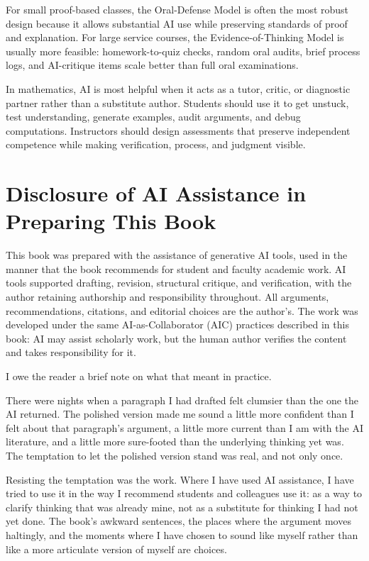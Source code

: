\documentclass{SIAMbook2023}
\begin{document}
For small proof-based classes, the Oral-Defense Model is often the most robust design because it allows substantial AI use while preserving standards of proof and explanation. For large service courses, the Evidence-of-Thinking Model is usually more feasible: homework-to-quiz checks, random oral audits, brief process logs, and AI-critique items scale better than full oral examinations.

In mathematics, AI is most helpful when it acts as a tutor, critic, or diagnostic partner rather than a substitute author. Students should use it to get unstuck, test understanding, generate examples, audit arguments, and debug computations. Instructors should design assessments that preserve independent competence while making verification, process, and judgment visible.

\newpage

\chapter{Disclosure of AI Assistance in Preparing This Book}
\label{app:disclosure}

This book was prepared with the assistance of generative AI tools, used in the manner that the book recommends for student and faculty academic work. AI tools supported drafting, revision, structural critique, and verification, with the author retaining authorship and responsibility throughout. All arguments, recommendations, citations, and editorial choices are the author's. The work was developed under the same AI-as-Collaborator (AIC) practices described in this book: AI may assist scholarly work, but the human author verifies the content and takes responsibility for it.

I owe the reader a brief note on what that meant in practice.

There were nights when a paragraph I had drafted felt clumsier than the one the AI returned. The polished version made me sound a little more confident than I felt about that paragraph's argument, a little more current than I am with the AI literature, and a little more sure-footed than the underlying thinking yet was. The temptation to let the polished version stand was real, and not only once.

Resisting the temptation was the work. Where I have used AI assistance, I have tried to use it in the way I recommend students and colleagues use it: as a way to clarify thinking that was already mine, not as a substitute for thinking I had not yet done. The book's awkward sentences, the places where the argument moves haltingly, and the moments where I have chosen to sound like myself rather than like a more articulate version of myself are choices.
\end{document}
